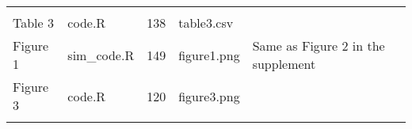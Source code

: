 \documentclass[
]{article}
\begin{document}
\begin{longtable}[]{@{}lllll@{}}
\begin{minipage}[t]{0.23\columnwidth}
\strut
\end{minipage}\tabularnewline
\begin{minipage}[t]{0.13\columnwidth}\raggedright
Table 3\strut
\end{minipage} & \begin{minipage}[t]{0.18\columnwidth}\raggedright
code.R\strut
\end{minipage} & \begin{minipage}[t]{0.09\columnwidth}\raggedright
138\strut
\end{minipage} & \begin{minipage}[t]{0.23\columnwidth}\raggedright
table3.csv\strut
\end{minipage} & \begin{minipage}[t]{0.23\columnwidth}\raggedright
\strut
\end{minipage}\tabularnewline
\begin{minipage}[t]{0.13\columnwidth}\raggedright
Figure 1\strut
\end{minipage} & \begin{minipage}[t]{0.18\columnwidth}\raggedright
sim\_code.R\strut
\end{minipage} & \begin{minipage}[t]{0.09\columnwidth}\raggedright
149\strut
\end{minipage} & \begin{minipage}[t]{0.23\columnwidth}\raggedright
figure1.png\strut
\end{minipage} & \begin{minipage}[t]{0.23\columnwidth}\raggedright
Same as Figure 2 in the supplement\strut
\end{minipage}\tabularnewline
\begin{minipage}[t]{0.13\columnwidth}\raggedright
Figure 3\strut
\end{minipage} & \begin{minipage}[t]{0.18\columnwidth}\raggedright
code.R\strut
\end{minipage} & \begin{minipage}[t]{0.09\columnwidth}\raggedright
120\strut
\end{minipage} & \begin{minipage}[t]{0.23\columnwidth}\raggedright
figure3.png\strut
\end{minipage} & \begin{minipage}[t]{0.23\columnwidth}\raggedright
\strut
\end{minipage}\tabularnewline
\begin{minipage}[t]{0.13\columnwidth}\raggedright

\end{minipage}
\end{longtable}
\end{document}
